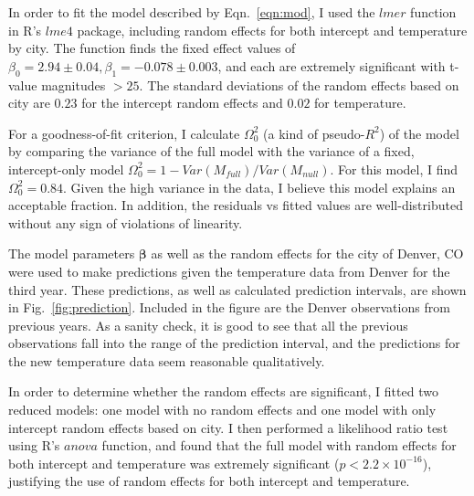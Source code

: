 \documentclass[11pt]{article}
\begin{document}
In order to fit the model described by Eqn.~\ref{eqn:mod}, I used the $lmer$ function in R's $lme4$ package, including random effects for both intercept and temperature by city. The function finds the fixed effect values of $\beta_0 = 2.94 \pm 0.04, \beta_1 = -0.078 \pm 0.003$, and each are extremely significant with t-value magnitudes $>25$. The standard deviations of the random effects based on city are $0.23$ for the intercept random effects and $0.02$ for temperature.

For a goodness-of-fit criterion, I calculate $\Omega_0^2$ (a kind of pseudo-$R^2$) of the model by comparing the variance of the full model with the variance of a fixed, intercept-only model $\Omega_0^2 = 1-Var(M_{full})/Var(M_{null})$. For this model, I find $\Omega_0^2 = 0.84$. Given the high variance in the data, I believe this model explains an acceptable fraction. In addition, the residuals vs fitted values are well-distributed without any sign of violations of linearity.

The model parameters $\boldsymbol{\beta}$ as well as the random effects for the city of Denver, CO were used to make predictions given the temperature data from Denver for the third year. These predictions, as well as calculated prediction intervals, are shown in Fig.~\ref{fig:prediction}. Included in the figure are the Denver observations from previous years. As a sanity check, it is good to see that all the previous observations fall into the range of the prediction interval, and the predictions for the new temperature data seem reasonable qualitatively. 

In order to determine whether the random effects are significant, I fitted two reduced models: one model with no random effects and one model with only intercept random effects based on city. I then performed a likelihood ratio test using R's $anova$ function, and found that the full model with random effects for both intercept and temperature was extremely significant ($p<2.2\times10^{-16}$), justifying the use of random effects for both intercept and temperature.
\end{document}
